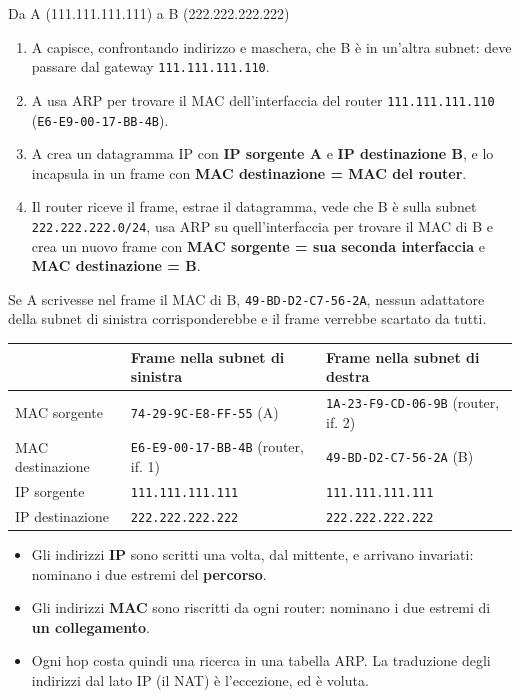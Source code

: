 \begin{esempio}{Da A (111.111.111.111) a B (222.222.222.222)}
\begin{enumerate}
    \item A capisce, confrontando indirizzo e maschera, che B è in un'altra subnet: deve passare dal gateway \texttt{111.111.111.110}.
    \item A usa ARP per trovare il MAC dell'interfaccia del router \texttt{111.111.111.110} (\texttt{E6-E9-00-17-BB-4B}).
    \item A crea un datagramma IP con \textbf{IP sorgente A} e \textbf{IP destinazione B}, e lo incapsula in un frame con
          \textbf{MAC destinazione = MAC del router}.
    \item Il router riceve il frame, estrae il datagramma, vede che B è sulla subnet \texttt{222.222.222.0/24}, usa ARP su quell'interfaccia per
          trovare il MAC di B e crea un nuovo frame con \textbf{MAC sorgente = sua seconda interfaccia} e \textbf{MAC destinazione = B}.
\end{enumerate}
Se A scrivesse nel frame il MAC di B, \texttt{49-BD-D2-C7-56-2A}, nessun adattatore della subnet di sinistra corrisponderebbe e il
frame verrebbe scartato da tutti.
\begin{center}
\begin{tabular}{lll}
\toprule
 & \textbf{Frame nella subnet di sinistra} & \textbf{Frame nella subnet di destra} \\
\midrule
MAC sorgente & \texttt{74-29-9C-E8-FF-55} (A) & \texttt{1A-23-F9-CD-06-9B} (router, if. 2) \\
MAC destinazione & \texttt{E6-E9-00-17-BB-4B} (router, if. 1) & \texttt{49-BD-D2-C7-56-2A} (B) \\
IP sorgente & \texttt{111.111.111.111} & \texttt{111.111.111.111} \\
IP destinazione & \texttt{222.222.222.222} & \texttt{222.222.222.222} \\
\bottomrule
\end{tabular}
\end{center}
\end{esempio}

\begin{itemize}
    \item Gli indirizzi \textbf{IP} sono scritti una volta, dal mittente, e arrivano invariati: nominano i due estremi del
          \textbf{percorso}.
    \item Gli indirizzi \textbf{MAC} sono riscritti da ogni router: nominano i due estremi di \textbf{un collegamento}.
    \item Ogni hop costa quindi una ricerca in una tabella ARP. La traduzione degli indirizzi dal lato IP (il NAT) è l'eccezione, ed è
          voluta.
\end{itemize}

